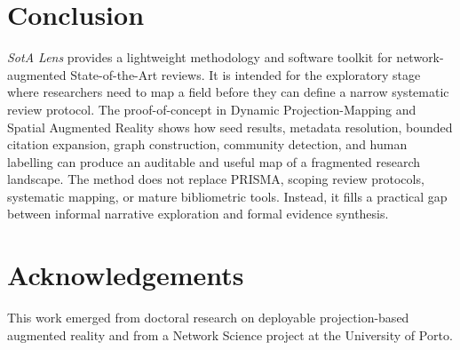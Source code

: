 \documentclass[11pt,a4paper]{article}
\newcommand{\tool}{\emph{SotA Lens}}
\newcommand{\sota}{State-of-the-Art}
\newcommand{\dpm}{Dynamic Projection-Mapping}
\newcommand{\sar}{Spatial Augmented Reality}
\begin{document}
\section{Conclusion}

\tool{} provides a lightweight methodology and software toolkit for network-augmented \sota{} reviews. It is intended for the exploratory stage where researchers need to map a field before they can define a narrow systematic review protocol. The proof-of-concept in \dpm{} and \sar{} shows how seed results, metadata resolution, bounded citation expansion, graph construction, community detection, and human labelling can produce an auditable and useful map of a fragmented research landscape. The method does not replace PRISMA, scoping review protocols, systematic mapping, or mature bibliometric tools. Instead, it fills a practical gap between informal narrative exploration and formal evidence synthesis.

\section*{Acknowledgements}

This work emerged from doctoral research on deployable projection-based augmented reality and from a Network Science project at the University of Porto.



\end{document}
